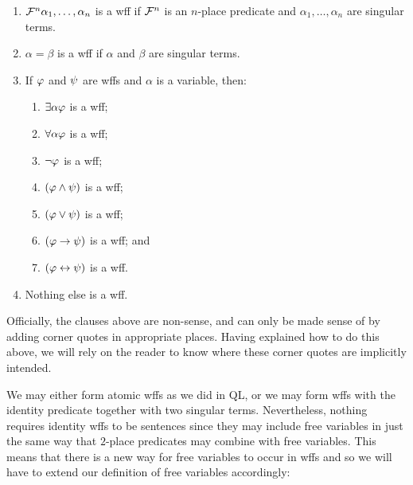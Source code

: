 \begin{enumerate}
  \item $\mathcal{F}^n\alpha_1,\ldots,\alpha_n$ is a wff if $\mathcal{F}^n$ is an $n$-place predicate and $\alpha_1,\ldots,\alpha_n$ are singular terms.
  \item $\alpha=\beta$ is a wff if $\alpha$ and $\beta$ are singular terms.
\item If $\varphi$ and $\psi$ are wffs and $\alpha$ is a variable, then:
	\begin{enumerate}
      \item $\exists \alpha\varphi$ is a wff;
      \item $\forall \alpha\varphi$ is a wff;
      \item $\neg\varphi$ is a wff;
      \item $(\varphi\wedge\psi)$ is a wff;
      \item $(\varphi\vee\psi)$ is a wff;
      \item $(\varphi\rightarrow\psi)$ is a wff; and
      \item $(\varphi\leftrightarrow\psi)$ is a wff.
	\end{enumerate}
\item Nothing else is a wff.
\end{enumerate}

Officially, the clauses above are non-sense, and can only be made sense of by adding corner quotes in appropriate places.
Having explained how to do this above, we will rely on the reader to know where these corner quotes are implicitly intended.

We may either form atomic wffs as we did in QL, or we may form wffs with the identity predicate together with two singular terms.
Nevertheless, nothing requires identity wffs to be sentences since they may include free variables in just the same way that $2$-place predicates may combine with free variables.
This means that there is a new way for free variables to occur in wffs and so we will have to extend our definition of free variables accordingly:

